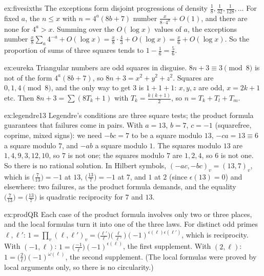\begin{solution}{ex:fivesixths}
\idea The exceptions form disjoint progressions of density $\frac18,\frac1{32},\frac1{128},\dots$
\writeup For fixed $a$, the $n\le x$ with $n=4^a(8b+7)$ number $\frac x{8\cdot4^a}+O(1)$, and there are none for $4^a>x$. Summing over the
$O(\log x)$ values of $a$, the exceptions number $\frac x8\sum_a4^{-a}+O(\log x)=\frac x8\cdot\frac43+O(\log x)=\frac x6+O(\log x)$. So
the proportion of sums of three squares tends to $1-\frac16=\frac56$.
\end{solution}

\begin{solution}{ex:eureka}
\idea Triangular numbers are odd squares in disguise.
\writeup $8n+3\equiv3\pmod8$ is not of the form $4^a(8b+7)$, so $8n+3=x^2+y^2+z^2$. Squares are $0,1,4\pmod8$, and the only way to
get $3$ is $1+1+1$: $x,y,z$ are odd, $x=2k+1$ etc. Then $8n+3=\sum(8T_k+1)$ with $T_k=\frac{k(k+1)}2$, so $n=T_k+T_l+T_m$.
\end{solution}

\begin{solution}{ex:legendre13}
\idea Legendre's conditions are three square tests; the product formula guarantees that failures come in pairs.
\writeup With $a=13$, $b=7$, $c=-1$ (squarefree, coprime, mixed signs): we need $-bc=7$ to be a square modulo $13$, $-ca=13\equiv6$ a
square modulo $7$, and $-ab$ a square modulo $1$. The squares modulo $13$ are $1,4,9,3,12,10$, so $7$ is not one; the squares modulo
$7$ are $1,2,4$, so $6$ is not one. So there is no rational solution. In Hilbert symbols, $(-ac,-bc)_v=(13,7)_v$, which is
$\bigl(\frac7{13}\bigr)=-1$ at $13$, $\bigl(\frac{13}7\bigr)=-1$ at $7$, and $1$ at $2$ (since $\epsilon(13)=0$) and elsewhere:
two failures, as the product formula demands, and the equality $\bigl(\frac7{13}\bigr)=\bigl(\frac{13}7\bigr)$ is quadratic
reciprocity for $7$ and $13$.
\end{solution}

\begin{solution}{ex:prodQR}
\idea Each case of the product formula involves only two or three places, and the local formulas turn it into one of the three
laws.
\writeup For distinct odd primes $\ell,\ell'$: $1=\prod_v(\ell,\ell')_v=\bigl(\frac{\ell'}\ell\bigr)\bigl(\frac\ell{\ell'}\bigr)
(-1)^{\epsilon(\ell)\epsilon(\ell')}$, which is reciprocity. With $(-1,\ell)$: $1=\bigl(\frac{-1}\ell\bigr)(-1)^{\epsilon(\ell)}$, the
first supplement. With $(2,\ell)$: $1=\bigl(\frac2\ell\bigr)(-1)^{\omega(\ell)}$, the second supplement. (The local formulas were
proved by local arguments only, so there is no circularity.)
\end{solution}

